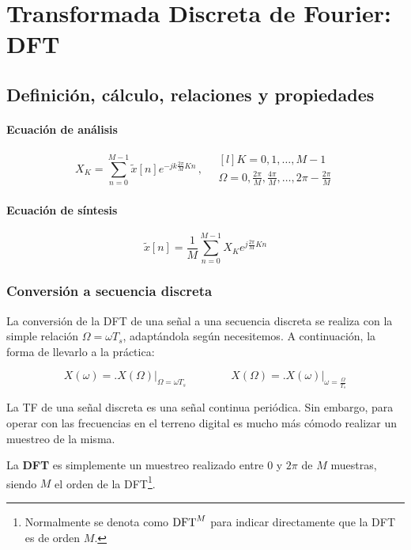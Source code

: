 \documentclass[a4paper,oneside]{book}
\begin{document}
\chapter{Transformada Discreta de Fourier: DFT}

\section{Definición, cálculo, relaciones y propiedades}

\subsubsection{Ecuación de análisis}
	
\[ X_K = \sum_{n=0}^{M-1}\tilde{x}[n]e^{-jk \frac{2\pi}{M}K n} \, , \quad 
\begin{matrix*}[l]
	K = 0, 1, \ldots , M-1 \\[5pt]
	\Omega = 0, \frac{2\pi}{M}, \frac{4\pi}{M}, \ldots , 2\pi - \frac{2\pi}{M}
\end{matrix*}\]
	
\subsubsection{Ecuación de síntesis}
	
\[ \tilde{x}[n] = \frac{1}{M} \sum_{n=0}^{M-1}X_Ke^{j \frac{2\pi}{M}Kn}\]


\subsection{Conversión a secuencia discreta}

La conversión de la DFT de una señal a una secuencia discreta se realiza con la simple relación $\Omega = \omega T_s$, adaptándola según necesitemos. A continuación, la forma de llevarlo a la práctica:

\[ X \left( \omega \right) = \biggl. X \left( \Omega \right)  \biggr\vert _{\Omega = \omega T_s} \qquad \qquad X \left( \Omega \right) = \biggl. X \left( \omega \right)  \biggr\vert _{\omega = \frac{\Omega}{T_s}} \]

La TF de una señal discreta es una señal continua periódica. Sin embargo, para operar con las frecuencias en el terreno digital es mucho más cómodo realizar un muestreo de la misma.

La \textbf{DFT} es simplemente un muestreo realizado entre $0$ y $2\pi$ de $M$ muestras, siendo $M$ el orden de la DFT\footnote{Normalmente se denota como $\operatorname{DFT}^M$ para indicar directamente que la DFT es de orden $M$.}.
\end{document}
